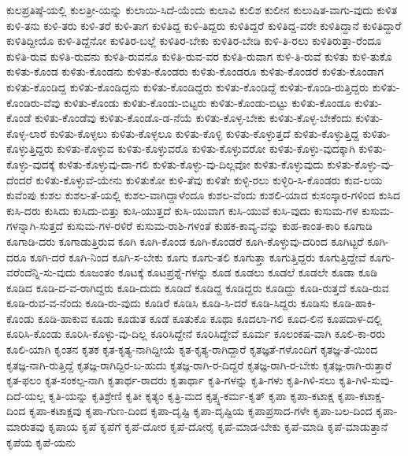 {ಕುಲಪ್ರತಿಷ್ಠೆ-ಯಲ್ಲಿ
ಕುಲತ್ರೀ-ಯನ್ನು
ಕುಲಾಯಿ-ಸಿದೆ-ಯೆಂದು
ಕುಲಾವಿ
ಕುಲಿಶ
ಕುಲೀನ
ಕುಲುಷಿತ-ವಾಗು-ವುದು
ಕುಳಿತ
ಕುಳಿ-ತನು
ಕುಳಿ-ತರು
ಕುಳಿ-ತರೆ
ಕುಳಿ-ತಾಗ
ಕುಳಿತಿದ್ದ
ಕುಳಿ-ತಿದ್ದರು
ಕುಳಿತಿದ್ದರೆ
ಕುಳಿತಿದ್ದ-ವರೇ
ಕುಳಿತಿದ್ದಾನೆ
ಕುಳಿತಿದ್ದಾರೆ
ಕುಳಿತಿದ್ದೀಯೊ
ಕುಳಿ-ತಿದ್ದೆನೋ
ಕುಳಿತಿರ-ಬಲ್ಲೆ
ಕುಳಿತಿರ-ಬೇಕು
ಕುಳಿತಿರ-ಬೇಡಿ
ಕುಳಿ-ತಿ-ರಲು
ಕುಳಿತಿರುತ್ತಾ-ರೆಂದೂ
ಕುಳಿತಿ-ರುವ
ಕುಳಿತಿ-ರುವನು
ಕುಳಿತಿ-ರುವನೊ
ಕುಳಿತಿ-ರುವ-ವರ
ಕುಳಿತಿ-ರುವಾಗ
ಕುಳಿ-ತಿ-ರುವೆ
ಕುಳಿತು
ಕುಳಿ-ತುಕೊ
ಕುಳಿತು-ಕೊಂಡ
ಕುಳಿತು-ಕೊಂಡನು
ಕುಳಿತು-ಕೊಂಡರು
ಕುಳಿತು-ಕೊಂಡರೂ
ಕುಳಿತು-ಕೊಂಡರೆ
ಕುಳಿತು-ಕೊಂಡಾಗ
ಕುಳಿತು-ಕೊಂಡಿದ್ದ
ಕುಳಿತು-ಕೊಂಡಿದ್ದನು
ಕುಳಿತು-ಕೊಂಡಿದ್ದರು
ಕುಳಿತು-ಕೊಂಡಿದ್ದೆ
ಕುಳಿತು-ಕೊಂಡಿ-ರುತ್ತಿದ್ದರು
ಕುಳಿತು-ಕೊಂಡಿರು-ವೆವು
ಕುಳಿತು-ಕೊಂಡು
ಕುಳಿತು-ಕೊಂಡು-ಬಿಟ್ಟರು
ಕುಳಿತು-ಕೊಂಡು-ಬಿಟ್ಟು
ಕುಳಿತು-ಕೊಂಡೂ
ಕುಳಿತು-ಕೊಂಡೆ
ಕುಳಿತು-ಕೊಂಡೆವು
ಕುಳಿತು-ಕೊಂಡೊ-ಡ-ನೆಯೆ
ಕುಳಿತು-ಕೊಳ್ಳ-ಬೇಕು
ಕುಳಿತು-ಕೊಳ್ಳ-ಬೇಕೆಂದು
ಕುಳಿತು-ಕೊಳ್ಳ-ಲಾರೆ
ಕುಳಿತು-ಕೊಳ್ಳಲು
ಕುಳಿತು-ಕೊಳ್ಳಲೂ
ಕುಳಿತು-ಕೊಳ್ಳಿ
ಕುಳಿತು-ಕೊಳ್ಳುತ್ತದೆ
ಕುಳಿತು-ಕೊಳ್ಳುತ್ತಿದ್ದ
ಕುಳಿತು-ಕೊಳ್ಳುತ್ತಿದ್ದರು
ಕುಳಿತು-ಕೊಳ್ಳುವ
ಕುಳಿತು-ಕೊಳ್ಳುವರೊ
ಕುಳಿತು-ಕೊಳ್ಳುವರೋ
ಕುಳಿತು-ಕೊಳ್ಳು-ವುದಕ್ಕಾಗಿ
ಕುಳಿತು-ಕೊಳ್ಳು-ವುದಕ್ಕೆ
ಕುಳಿತು-ಕೊಳ್ಳುವು-ದಾ-ಗಲಿ
ಕುಳಿತು-ಕೊಳ್ಳು-ವು-ದಿಲ್ಲವೋ
ಕುಳಿತು-ಕೊಳ್ಳುವುದು
ಕುಳಿತು-ಕೊಳ್ಳು-ವು-ದೆಂದರೆ
ಕುಳಿತು-ಕೊಳ್ಳುವೆ-ಯೇನು
ಕುಳಿತುಕೋ
ಕುಳಿ-ತೆವು
ಕುಳಿತೇ
ಕುಳ್ಳಿ-ರಲು
ಕುಳ್ಳಿರಿ-ಸಿ-ಕೊಂಡರು
ಕುವ-ಲಯ
ಕುವೆಂಪು
ಕುಶಲ
ಕುಶಲ-ತೆ-ಯಲ್ಲಿ
ಕುಶಲ-ವಾಗಿದ್ದಾಳೆಂದೂ
ಕುಶಲ-ವೆಂದು
ಕುಶಲಿ-ಯಾದ
ಕುಸಂಸ್ಕಾರ-ಗಳಿಂದ
ಕುಸಿದ
ಕುಸಿ-ದರು
ಕುಸಿದು
ಕುಸಿದು-ಬಿತ್ತು
ಕುಸಿ-ಯುತ್ತದೆ
ಕುಸಿ-ಯುವಾಗ
ಕುಸಿ-ಯುವೆ
ಕುಸಿ-ವುದು
ಕುಸುಮ-ಗಳ
ಕುಸುಮ-ಗಳನ್ನಾಗಿ-ಸುತ್ತದೆ
ಕುಸುಮ-ಗಳ-ರಳಿರೆ
ಕುಸುಮ-ರಾಶಿ-ಗಳಂತೆ
ಕುಹಕ-ಕಾವ್ಯ-ವನ್ನು
ಕುಹ-ಕಾಂತ-ಕಾರಿ
ಕೂಗಾಡಿ
ಕೂಗಾಡಿ-ದರು
ಕೂಗಾಡುತ್ತಿರುವ
ಕೂಗಿ
ಕೂಗಿ-ಕೊಂಡ
ಕೂಗಿ-ಕೊಂಡರೆ
ಕೂಗಿ-ಕೊಳ್ಳುವು-ದರಿಂದ
ಕೂಗಿಟ್ಟರೆ
ಕೂಗಿ-ದರೂ
ಕೂಗಿ-ದರೆ
ಕೂಗಿ-ನಿಂದ
ಕೂಗಿ-ಸ-ಬೇಕು
ಕೂಗು
ಕೂಗು-ತಲಿ
ಕೂಗುತ್ತಾ
ಕೂಗುತ್ತಿದ್ದರು
ಕೂಗುತ್ತಿದ್ದೇವೆ
ಕೂಗು-ವರೆಂದೆನ್ನಿ-ಸು-ವುದು
ಕೂಜಂತಂ
ಕೂಟಕ್ಕೆ
ಕೂಟಪ್ರಶ್ನೆ-ಗಳನ್ನು
ಕೂಡ
ಕೂಡಲು
ಕೂಡಲೆ
ಕೂಡಲೇ
ಕೂಡಾ
ಕೂಡಿ
ಕೂಡಿದ
ಕೂಡಿ-ದ-ವ-ರಾಗಿದ್ದರು
ಕೂಡಿ-ದುದು
ಕೂಡಿದೆ
ಕೂಡಿದ್ದ
ಕೂಡಿದ್ದರು
ಕೂಡಿದ್ದು
ಕೂಡಿ-ರುತ್ತದೆ
ಕೂಡಿ-ರುವ
ಕೂಡಿ-ರುವ-ವ-ನೆಂದು
ಕೂಡಿ-ರು-ವುದು
ಕೂಡಿರೆ
ಕೂಡಿಸಿ
ಕೂಡಿ-ಸಿ-ದರೆ
ಕೂಡಿ-ಸಿದ್ದರು
ಕೂಡಿಸು
ಕೂಡಿ-ಹಾಕಿ-ಕೊಂಡು
ಕೂಡಿ-ಹಾಕುವ
ಕೂಡು
ಕೂಡುತ
ಕೂಡೆ
ಕೂತುಕೊ
ಕೂಥಾ
ಕೂದಲಾ-ಗಲಿ
ಕೂದ-ಲಿನ
ಕೂಪದಾಳ-ದಲ್ಲಿ
ಕೂರಿಸಿ-ಕೊಂಡು
ಕೂರಿಸಿ-ಕೊಳ್ಳು-ವು-ದಿಲ್ಲ
ಕೂರಿಸಿದ್ದೇನೆ
ಕೂರಿಸಿದ್ದೇವೆ
ಕೂರ್ಮ
ಕೂಲಂಕಷ-ವಾಗಿ
ಕೂಲಿ-ಕಾ-ರರು
ಕೂಲಿ-ಯಾಗಿ
ಕೃಂತನ
ಕೃತಕ
ಕೃತ-ಕೃತ್ಯ-ನಾಗಿದ್ದೀಯೆ
ಕೃತ-ಕೃತ್ಯ-ರಾಗಿದ್ದಾರೆ
ಕೃತಜ್ಞತೆ-ಗಳೊಂದಿಗೆ
ಕೃತಜ್ಞ-ತೆ-ಯಿಂದ
ಕೃತಜ್ಞ-ನಾಗಿ-ರುತ್ತಿದ್ದೆ
ಕೃತಜ್ಞ-ರಾಗಿದ್ದಿರ-ಬ-ಹುದು
ಕೃತಜ್ಞ-ರಾಗಿ-ರ-ದಿದ್ದರೆ
ಕೃತಜ್ಞ-ರಾಗಿ-ರ-ಬೇಕು
ಕೃತಜ್ಞ-ರಾಗಿ-ರುತ್ತಾರೆ
ಕೃತ-ಫಲಂ
ಕೃತ-ಸಂಕಲ್ಪ-ನಾಗಿ
ಕೃತಾರ್ಥ-ರಾದರು
ಕೃತಾರ್ಥಾ
ಕೃತಿ-ಗಳನ್ನು
ಕೃತಿ-ಗಳು
ಕೃತಿ-ಗಿಳಿ-ಸಲು
ಕೃತಿ-ಗಿಳಿ-ಸುವು-ದಿದೆ-ಯಲ್ಲ
ಕೃತಿ-ಯನ್ನು
ಕೃತಿಶ್ರೇಣಿ
ಕೃತೀ
ಕೃತ್ಯಂ
ಕೃತ್ರಿ-ಮದ
ಕೃತ್ಸ್ನ-ಕರ್ಮ-ಕೃತ್
ಕೃಪಾ
ಕೃಪಾ-ಕಟಾಕ್ಷ
ಕೃಪಾ-ಕಟಾಕ್ಷ-ದಿಂದ
ಕೃಪಾ-ಕಟಾಕ್ಷವು
ಕೃಪಾ-ಗುಣ-ದಿಂದ
ಕೃಪಾ-ದೃಷ್ಟಿ
ಕೃಪಾ-ದೃಷ್ಟಿಯ
ಕೃಪಾಪ್ರಸಾದ-ಗಳೇ
ಕೃಪಾ-ಬಲ-ದಿಂದ
ಕೃಪಾ-ಮಾರುತವು
ಕೃಪಾಯ
ಕೃಪೆ
ಕೃಪೆಗೆ
ಕೃಪೆ-ದೋರ
ಕೃಪೆ-ದೋರೈ
ಕೃಪೆ-ಮಾಡ-ಬೇಕು
ಕೃಪೆ-ಮಾಡಿ
ಕೃಪೆ-ಮಾಡುತ್ತಾನೆ
ಕೃಪೆಯ
ಕೃಪೆ-ಯನು
}

